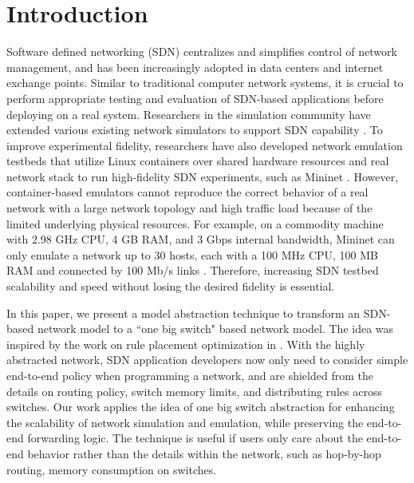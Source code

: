 \section{Introduction}


Software defined networking (SDN) centralizes and simplifies control of network management, and has been increasingly adopted in data centers and internet exchange points\cite{B4, Meridian, SDX}.
Similar to traditional computer network systems, it is crucial to perform appropriate testing and evaluation of SDN-based applications before deploying on a real system.
Researchers in the simulation community have extended various existing network simulators to support SDN capability \cite{S3F, NS3, OPNET}. To improve experimental fidelity, researchers have also developed network emulation testbeds that utilize Linux containers over shared hardware resources and real network stack to run high-fidelity SDN experiments, such as Mininet \cite{Mininet}. However, container-based emulators cannot reproduce the correct behavior of a real network with a large network topology and high traffic load because of the limited underlying physical resources. For example, on a commodity machine with 2.98 GHz CPU, 4 GB RAM, and 3 Gbps internal bandwidth, Mininet can only emulate a network up to 30 hosts, each with a 100 MHz CPU, 100 MB RAM and connected by 100 Mb/s links \cite{ReproNetExprCBE}. Therefore, increasing SDN testbed scalability and speed without losing the desired fidelity is essential.


In this paper, we present a model abstraction technique to transform an SDN-based network model to a ``one big switch" based network model. The idea was inspired by the work on rule placement optimization in \cite{OneBigSwitchAbstraction}. With the highly abstracted network, SDN application developers now only need to consider simple end-to-end policy when programming a network, and are shielded from the details on routing policy, switch memory limits, and distributing rules across switches. Our work applies the idea of one big switch abstraction for enhancing the scalability of network simulation and emulation, while preserving the end-to-end forwarding logic. The technique is useful if users only care about the end-to-end behavior rather than the details within the network, such as hop-by-hop routing, memory consumption on switches.

